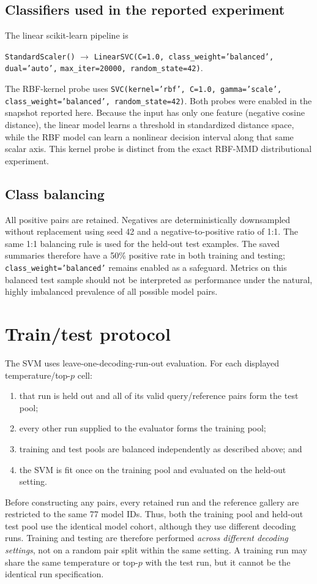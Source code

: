 \documentclass[11pt,a4paper]{article}
\begin{document}
\subsection{Classifiers used in the reported experiment}
The linear scikit-learn pipeline is
\begin{center}
\texttt{StandardScaler()} $\rightarrow$
\texttt{LinearSVC(C=1.0, class\_weight='balanced', dual='auto',}
\texttt{max\_iter=20000, random\_state=42)}.
\end{center}
The RBF-kernel probe uses
\texttt{SVC(kernel='rbf', C=1.0, gamma='scale',
class\_weight='balanced', random\_state=42)}.  Both probes were enabled in the
snapshot reported here.  Because the input has only one feature (negative
cosine distance), the linear model learns a threshold in standardized distance
space, while the RBF model can learn a nonlinear decision interval along that
same scalar axis.  This kernel probe is distinct from the exact RBF-MMD
distributional experiment.

\subsection{Class balancing}
All positive pairs are retained.  Negatives are deterministically downsampled
without replacement using seed 42 and a negative-to-positive ratio of 1:1.
The same 1:1 balancing rule is used for the held-out test examples.  The saved
summaries therefore have a 50\% positive rate in both training and testing;
\texttt{class\_weight='balanced'} remains enabled as a safeguard.  Metrics on
this balanced test sample should not be interpreted as performance under the
natural, highly imbalanced prevalence of all possible model pairs.

\section{Train/test protocol}
The SVM uses leave-one-decoding-run-out evaluation.  For each displayed
temperature/top-$p$ cell:
\begin{enumerate}
  \item that run is held out and all of its valid query/reference pairs form
        the test pool;
  \item every other run supplied to the evaluator forms the training pool;
  \item training and test pools are balanced independently as described above;
        and
  \item the SVM is fit once on the training pool and evaluated on the held-out
        setting.
\end{enumerate}
Before constructing any pairs, every retained run and the reference gallery are
restricted to the same 77 model IDs. Thus, both the training pool and held-out
test pool use the identical model cohort, although they use different decoding
runs.
Training and testing are therefore performed \emph{across different decoding
settings}, not on a random pair split within the same setting.  A training run
may share the same temperature or top-$p$ with the test run, but it cannot be
the identical run specification.
\end{document}
